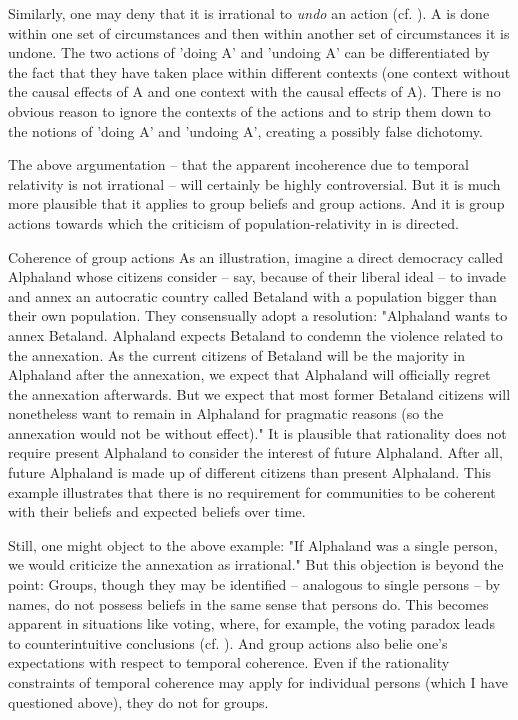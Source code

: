Similarly, one may deny that it is irrational to \emph{undo} an action (cf. ). A is done within one set of circumstances and then within another set of circumstances it is undone. The two actions of 'doing A' and 'undoing A' can be differentiated by the fact that they have taken place within different contexts (one context without the causal effects of A and one context with the causal effects of A). There is no obvious reason to ignore the contexts of the actions and to strip them down to the notions of 'doing A' and 'undoing A', creating a possibly false dichotomy. 

The above argumentation -- that the apparent incoherence due to temporal relativity is not irrational -- will certainly be highly controversial. But it is much more plausible that it applies to group beliefs and group actions. And it is group actions towards which the criticism of population-relativity in  is directed. 

\begin{Example}{Coherence of group actions}{}
As an illustration, imagine a direct democracy called Alphaland whose citizens consider -- say, because of their liberal ideal -- to invade and annex an autocratic country called Betaland with a population bigger than their own population. They consensually adopt a resolution: "Alphaland wants to annex Betaland. Alphaland expects Betaland to condemn the violence related to the annexation. As the current citizens of Betaland will be the majority in Alphaland after the annexation, we expect that Alphaland will officially regret the annexation afterwards. But we expect that most former Betaland citizens will nonetheless want to remain in Alphaland for pragmatic reasons (so the annexation would not be without effect)." It is plausible that rationality does not require present Alphaland to consider the interest of future Alphaland. After all, future Alphaland is made up of different citizens than present Alphaland. This example illustrates that there is no requirement for communities to be coherent with their beliefs and expected beliefs over time. 
\end{Example}

Still, one might object to the above example: "If Alphaland was a single person, we would criticize the annexation as irrational." But this objection is beyond the point: Groups, though they may be identified -- analogous to single persons -- by names, do not possess beliefs in the same sense that persons do. This becomes apparent in situations like voting, where, for example, the voting paradox leads to counterintuitive conclusions (cf. ). And group actions also belie one's expectations with respect to temporal coherence. Even if the rationality constraints of temporal coherence may apply for individual persons (which I have questioned above), they do not for groups. 

